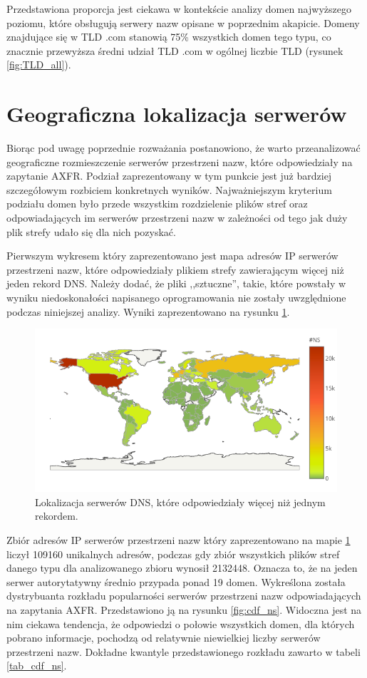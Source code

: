 Przedstawiona proporcja jest ciekawa w kontekście analizy domen najwyższego poziomu, które obsługują serwery nazw opisane
w poprzednim akapicie. Domeny znajdujące się w TLD .com stanowią 75\% wszystkich domen tego typu, co znacznie przewyższa średni udział
TLD .com w ogólnej liczbie TLD (rysunek \ref{fig:TLD_all}).

\section{Geograficzna lokalizacja serwerów}
\noindent Biorąc pod uwagę poprzednie rozważania postanowiono, że warto przeanalizować geograficzne rozmieszczenie serwerów przestrzeni nazw,
które odpowiedziały na zapytanie AXFR. Podział zaprezentowany w tym punkcie jest już bardziej szczegółowym rozbiciem konkretnych
wyników. Najważniejszym kryterium podziału domen było przede wszystkim rozdzielenie plików stref oraz odpowiadających im serwerów
przestrzeni nazw w zależności od tego jak duży plik strefy udało się dla nich pozyskać.

Pierwszym wykresem który zaprezentowano jest mapa adresów IP serwerów przestrzeni nazw, które odpowiedziały plikiem strefy zawierającym
więcej niż jeden rekord DNS. Należy dodać, że pliki ,,sztuczne'', takie, które powstały w wyniku niedoskonałości napisanego oprogramowania
nie zostały uwzględnione podczas niniejszej analizy. Wyniki zaprezentowano na rysunku \ref{fig:many_lines_map}.

\begin{figure}[h]
\centering
\includegraphics[width=1.0\textwidth]{image/many_lines_map_no_title}
\caption{Lokalizacja serwerów DNS, które odpowiedziały więcej niż jednym rekordem.}
\label{fig:many_lines_map}
\end{figure}

Zbiór adresów IP serwerów przestrzeni nazw który zaprezentowano na mapie \ref{fig:many_lines_map} liczył 109160 unikalnych adresów, podczas
gdy zbiór wszystkich plików stref danego typu dla analizowanego zbioru wynosił 2132448. Oznacza to, że na jeden serwer autorytatywny
średnio przypada ponad 19 domen. Wykreślona została dystrybuanta rozkładu popularności serwerów przestrzeni nazw odpowiadających na
zapytania AXFR. Przedstawiono ją na rysunku \ref{fig:cdf_ns}. Widoczna jest na nim ciekawa tendencja, że odpowiedzi o połowie
wszystkich domen, dla których pobrano informacje, pochodzą od relatywnie niewielkiej liczby serwerów przestrzeni nazw. Dokładne
kwantyle przedstawionego rozkładu zawarto w tabeli \ref{tab_cdf_ns}.

